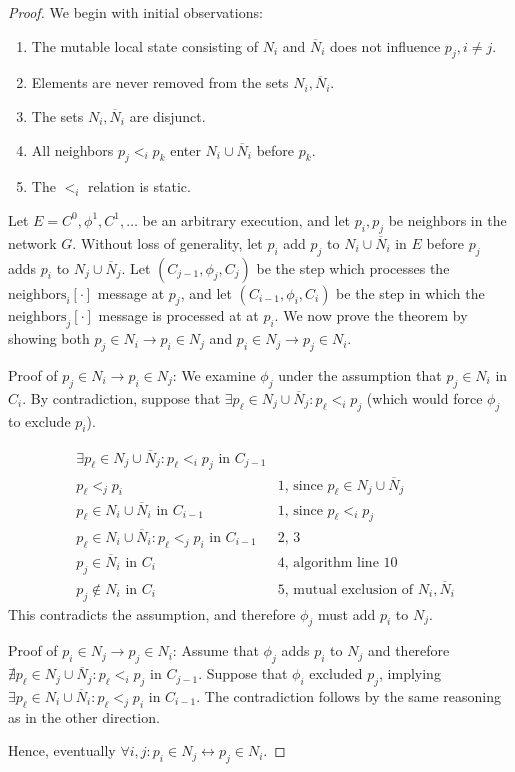 \begin{proof}
We begin with initial observations:

\begin{enumerate}
\item The mutable local state consisting of $N_i$ and
$\overline{N}_i$ does not influence $p_j, i \neq j$.
\item Elements are never removed from the sets $N_i, \overline{N}_i$.
\item The sets $N_i, \overline{N}_i$ are disjunct.
\item All neighbors $p_j <_i p_k$ enter $N_i \cup \overline{N}_i$ before $p_k$.
\item The $<_i$ relation is static.
\end{enumerate}

Let $E = C^0, \phi^1, C^1, \ldots$ be an arbitrary execution, and let $p_i, p_j$ be neighbors
in the network $G$. Without loss of generality, let $p_i$ add $p_j$ to $N_i \cup \overline{N}_i$
in $E$ before $p_j$ adds $p_i$ to $N_j \cup \overline{N}_j$. 
Let $(C_{j-1}, \phi_j, C_j)$ be the step which processes
the $\text{neighbors}_i[\cdot]$ message at $p_j$, and let $(C_{i-1}, \phi_i, C_i)$
be the step in which the $\text{neighbors}_j[\cdot]$ message is processed at at $p_i$.
We now prove the theorem by
showing both $p_j \in N_i \rightarrow p_i \in N_j$ and $p_i \in N_j \rightarrow p_j \in N_i$.

Proof of $p_j \in N_i \rightarrow p_i \in N_j$: 
We examine $\phi_j$ under the assumption that $p_j \in N_i$ in $C_i$.
By contradiction, suppose that $\exists p_\ell \in N_j \cup \overline{N}_j: 
p_\ell <_i p_j$ (which would force $\phi_j$ to exclude $p_i$). 

\begin{align}
&\exists p_\ell \in N_j \cup \overline{N}_j: p_\ell <_i p_j \text{ in } C_{j-1} & \\
&p_\ell <_j p_i & \text{1, since } p_\ell \in N_j \cup \overline{N}_j \\
&p_\ell \in N_i \cup \overline{N}_i \text{ in } C_{i-1} & \text{1, since } p_\ell <_i p_j \\
&p_\ell \in N_i \cup \overline{N}_i: p_\ell <_j p_i \text{ in } C_{i-1} & \text{2, 3} \\
&p_j \in \overline{N}_i \text{ in } C_i & \text{4, algorithm line 10} \\
&p_j \not\in N_i \text{ in } C_i & \text{5, mutual exclusion of } N_i, \overline{N}_i
\end{align}
This contradicts the assumption, and therefore $\phi_j$ must add $p_i$ to $N_j$.

Proof of $p_i \in N_j \rightarrow p_j \in N_i$: Assume that $\phi_j$ adds
$p_i$ to $N_j$ and therefore $\nexists p_\ell \in N_j \cup \overline{N}_j: 
p_\ell <_i p_j$ in $C_{j-1}$. Suppose that $\phi_i$ excluded $p_j$, implying
$\exists p_\ell \in N_i \cup \overline{N}_i: p_\ell <_j p_i \text{ in } C_{i-1}$.
The contradiction follows by the same reasoning as in the other direction.

Hence, eventually $\forall i,j: p_i \in N_j \leftrightarrow p_j \in N_i$.
\end{proof}


